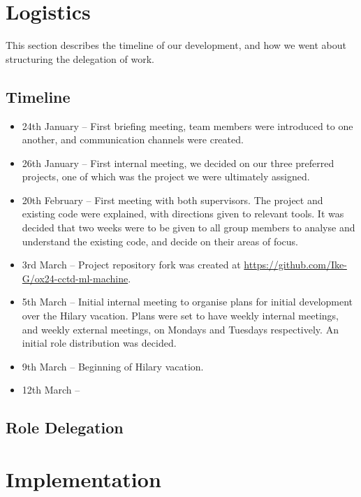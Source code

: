 \documentclass{article}
\begin{document}
\section{Logistics}%
\label{sec:logistics}

This section describes the timeline of our development, and how we went about structuring the delegation of work.

\subsection{Timeline}%
\label{subsec:timeline}

\begin{itemize}
        \item 24th January -- First briefing meeting, team members were introduced to one another, and communication channels were created.
        \item 26th January -- First internal meeting, we decided on our three preferred projects, one of which was the project we were ultimately assigned.
        \item 20th February -- First meeting with both supervisors. The project and existing code were explained, with directions given to relevant tools. It was decided that two weeks were to be given to all group members to analyse and understand the existing code, and decide on their areas of focus.
        \item 3rd March -- Project repository fork was created at \url{https://github.com/Ike-G/ox24-cctd-ml-machine}.
        \item 5th March -- Initial internal meeting to organise plans for initial development over the Hilary vacation. Plans were set to have weekly internal meetings, and weekly external meetings, on Mondays and Tuesdays respectively. An initial role distribution was decided.
        \item 9th March -- Beginning of Hilary vacation.
        \item 12th March --

\end{itemize}

\subsection{Role Delegation}%
\label{subsec:delegation}

\section{Implementation}%
\label{sec:implementation}
\end{document}
